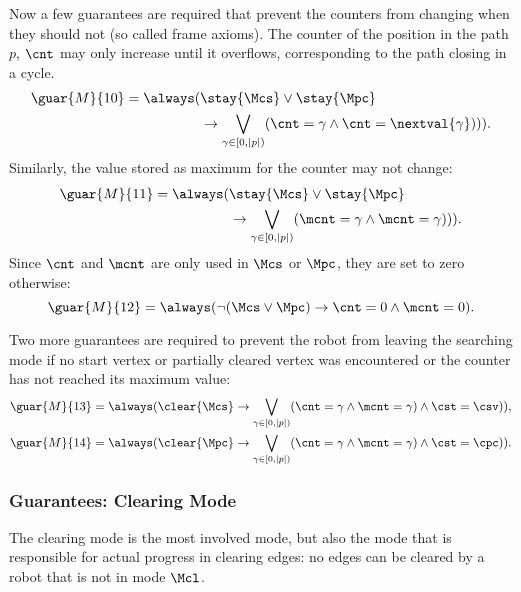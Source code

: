 Now a few guarantees are required that prevent the counters from changing when they should not (so called frame axioms). The counter of the position in the path $p$, $\cnt$ may only increase until it overflows, corresponding to the path closing in a cycle.
\begin{align*}
	\guar{M}{10} = \always(&\stay{\Mcs} \vee \stay{\Mpc} \\&\rightarrow \bigvee_{\gamma \in [0, |p|)}(\cnt=\gamma \wedge \next(\cnt=\nextval{\gamma}))).
\end{align*}
Similarly, the value stored as maximum for the counter may not change:
\begin{align*}
	\guar{M}{11} = \always(&\stay{\Mcs} \vee \stay{\Mpc} \\&\rightarrow \bigvee_{\gamma \in [0, |p|)}(\mcnt=\gamma \wedge \next(\mcnt=\gamma))).
\end{align*}
Since $\cnt$ and $\mcnt$ are only used in $\Mcs$ or $\Mpc$, they are set to zero otherwise:
\begin{equation*}
	\guar{M}{12} = \always(\neg(\Mcs \vee \Mpc) \rightarrow \cnt=0 \wedge \mcnt=0).
\end{equation*}

Two more guarantees are required to prevent the robot from leaving the searching mode if no start vertex or partially cleared vertex was encountered or the counter has not reached its maximum value:
\begin{align*}
	&\guar{M}{13} = \always(\clear{\Mcs} \rightarrow \bigvee_{\gamma \in [0, |p|)}(\cnt=\gamma \wedge \mcnt=\gamma) \wedge \next(\cst=\csv)),\\
	&\guar{M}{14} = \always(\clear{\Mpc} \rightarrow \bigvee_{\gamma \in [0, |p|)}(\cnt=\gamma \wedge \mcnt=\gamma) \wedge \next(\cst=\cpc)).
\end{align*}


\subsubsection{Guarantees: Clearing Mode}

The clearing mode is the most involved mode, but also the mode that is responsible for actual progress in clearing edges: no edges can be cleared by a robot that is not in mode $\Mcl$.\\

